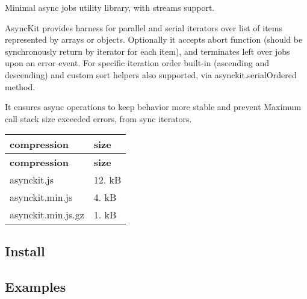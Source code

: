 Minimal async jobs utility library, with streams support.

\href{https://travis-ci.org/alexindigo/asynckit}{\tt } \href{https://travis-ci.org/alexindigo/asynckit}{\tt } \href{https://ci.appveyor.com/project/alexindigo/asynckit}{\tt }

\href{https://coveralls.io/github/alexindigo/asynckit?branch=master}{\tt } \href{https://david-dm.org/alexindigo/asynckit}{\tt } \href{https://www.bithound.io/github/alexindigo/asynckit}{\tt }

Async\+Kit provides harness for {\ttfamily parallel} and {\ttfamily serial} iterators over list of items represented by arrays or objects. Optionally it accepts abort function (should be synchronously return by iterator for each item), and terminates left over jobs upon an error event. For specific iteration order built-\/in ({\ttfamily ascending} and {\ttfamily descending}) and custom sort helpers also supported, via {\ttfamily asynckit.\+serial\+Ordered} method.

It ensures async operations to keep behavior more stable and prevent {\ttfamily Maximum call stack size exceeded} errors, from sync iterators.

\tabulinesep=1mm
\begin{longtabu} spread 0pt [c]{*{2}{|X[-1]}|}
\hline
\rowcolor{\tableheadbgcolor}\textbf{ compression  }&\textbf{ size   }\\
\endfirsthead
\hline
\endfoot
\hline
\rowcolor{\tableheadbgcolor}\textbf{ compression  }&\textbf{ size   }\\
\endhead
asynckit.\+js  &12. kB   \\
asynckit.\+min.\+js  &4. kB   \\
asynckit.\+min.\+js.\+gz  &1. kB   \\
\end{longtabu}


\subsection*{Install}




\subsection*{Examples}

